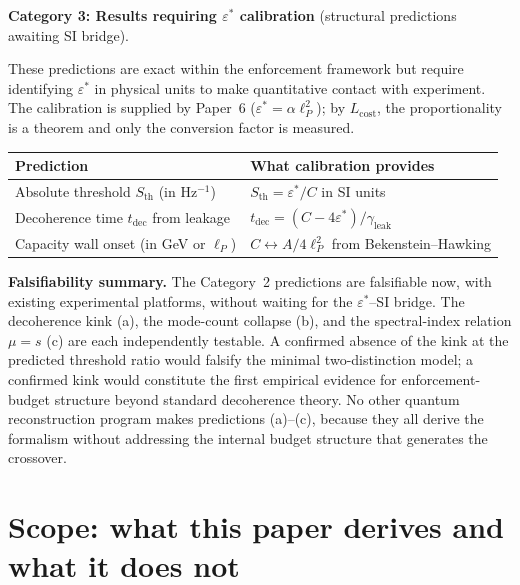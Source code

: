 \documentclass[11pt]{article}
\theoremstyle{remark}
\begin{document}
\medskip\noindent\textbf{Category 3: Results requiring $\varepsilon^*$ calibration} (structural predictions awaiting SI bridge).

These predictions are exact within the enforcement framework but require identifying $\varepsilon^*$ in physical units to make quantitative contact with experiment.  The calibration is supplied by Paper~6 ($\varepsilon^* = \alpha\ell_P^2$); by $L_{\mathrm{cost}}$, the proportionality is a theorem and only the conversion factor is measured.

\begin{center}
\smallskip
\begin{tabular}{@{}p{4.0cm}p{8.4cm}@{}}
\textbf{Prediction} & \textbf{What calibration provides} \\[2pt]
\hline\noalign{\smallskip}
Absolute threshold $S_{\mathrm{th}}$ (in Hz$^{-1}$) & $S_{\mathrm{th}} = \varepsilon^*/C$ in SI units \\[3pt]
Decoherence time $t_{\mathrm{dec}}$ from leakage & $t_{\mathrm{dec}} = (C - 4\varepsilon^*)/\gamma_{\mathrm{leak}}$ \\[3pt]
Capacity wall onset (in GeV or $\ell_P$) & $C \leftrightarrow A/4\ell_P^2$ from Bekenstein--Hawking \\
\end{tabular}
\label{tab:empirical_cat3}
\end{center}

\smallskip\noindent\textbf{Falsifiability summary.}  The Category~2 predictions are falsifiable now, with existing experimental platforms, without waiting for the $\varepsilon^*$--SI bridge.  The decoherence kink (a), the mode-count collapse (b), and the spectral-index relation $\mu = s$ (c) are each independently testable.  A confirmed absence of the kink at the predicted threshold ratio would falsify the minimal two-distinction model; a confirmed kink would constitute the first empirical evidence for enforcement-budget structure beyond standard decoherence theory.  No other quantum reconstruction program makes predictions (a)--(c), because they all derive the formalism without addressing the internal budget structure that generates the crossover.



\section{Scope: what this paper derives and what it does not}
\label{sec:scope}
\end{document}
